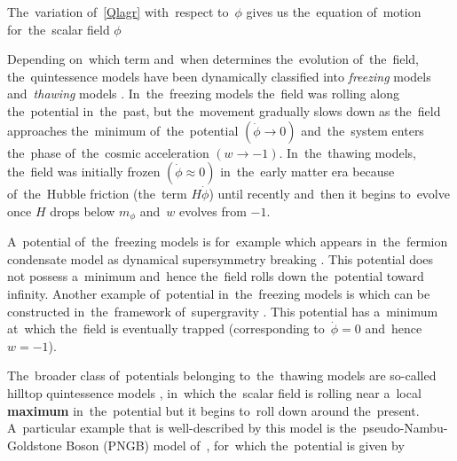 {The~variation of~\eqref{Qlagr} with~respect to~$\phi$ gives us the~equation of~motion for~the~scalar field $\phi$

Depending on~which term and~when determines the~evolution of~the~field, the~quintessence models have been dynamically classified into \textit{freezing} models and~\textit{thawing} models \parencite{2005PhRvL..95n1301C}. In~the~freezing models the~field was rolling along the~potential in~the~past, but the~movement gradually slows down as the~field approaches the~minimum of~the~potential $(\dot{\phi}\rightarrow0)$ and~the~system enters the~phase of~the~cosmic acceleration $(w\rightarrow-1)$. In~the~thawing models, the~field was initially frozen $(\dot{\phi}\approx0)$ in~the~early matter era because of~the~Hubble friction (the~term $H\dot{\phi}$) until recently and~then it begins to~evolve once $H$ drops below $m_\phi$ and~$w$ evolves from $-1$.

A~potential of~the~freezing models is for~example
which appears in~the~fermion condensate model as dynamical supersymmetry breaking \parencite{1999PhRvD..60f3502B}. This potential does not possess a~minimum and~hence the~field rolls down the~potential toward infinity. Another example of~potential in~the~freezing models is
which can be constructed in~the~framework of~supergravity \parencite{1999PhLB..468...40B}. This potential has a~minimum at~which the~field is eventually trapped (corresponding to~$\dot{\phi}=0$ and~hence $w=-1$).

The~broader class of~potentials belonging to~the~thawing models are so-called hilltop quintessence models \parencite{2008PhRvD..78l3525D}, in~which the~scalar field is rolling near a~local \textbf{maximum} in~the~potential but it begins to~roll down around the~present. A~particular example that is well-described by this model is the~pseudo-Nambu-Goldstone Boson (PNGB) model of~\textcite{1995PhRvL..75.2077F}, for~which the~potential is given by
} 

